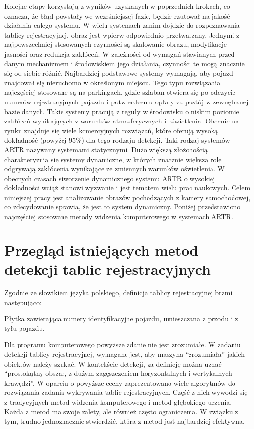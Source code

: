 \FloatBarrier
Kolejne etapy korzystają z wyników uzyskanych w poprzednich krokach, co oznacza, że błąd powstały we wcześniejszej fazie, będzie rzutował na jakość działania całego systemu.
W wielu systemach zanim dojdzie do rozpoznawania tablicy rejestracyjnej, obraz jest wpierw odpowiednio przetwarzany.
Jednymi z najpowszechniej stosowanych czynności są skalowanie obrazu, modyfikacje jasności oraz redukcja zakłóceń.
W zależności od wymagań stawianych przed danym mechanizmem i środowiskiem jego działania, czynności te mogą znacznie się od siebie różnić.
Najbardziej podstawowe systemy wymagają, aby pojazd znajdował się nieruchomo w określonym miejscu.
Tego typu rozwiązania najczęściej stosowane są na parkingach, gdzie szlaban otwiera się po odczycie numerów rejestracyjnych pojazdu i potwierdzeniu opłaty za postój w zewnętrznej bazie danych.
Takie systemy pracują z reguły w środowisku o niskim poziomie zakłóceń wynikających z warunków atmosferycznych i oświetlenia.
Obecnie na rynku znajduje się wiele komercyjnych rozwiązań, które oferują wysoką dokładność (powyżej 95\%) dla tego rodzaju detekcji.
Taki rodzaj systemów ARTR nazywany systemami statycznymi.
Dużo większą złożonością charakteryzują się systemy dynamiczne, w których znacznie większą rolę odgrywają zakłócenia wynikające ze zmiennych warunków oświetlenia.
W obecnych czasach stworzenie dynamicznego systemu ARTR o wysokiej dokładności wciąż stanowi wyzwanie i jest tematem wielu prac naukowych.
Celem niniejszej pracy jest analizowanie obrazów pochodzących z kamery samochodowej, co zdecydowanie sprawia, że jest to system dynamiczny.
Poniżej przedstawiono najczęściej stosowane metody widzenia komputerowego w systemach ARTR.


\section{Przegląd istniejących metod detekcji tablic rejestracyjnych}

Zgodnie ze słowikiem języka polskiego, definicja tablicy rejestracyjnej brzmi następująco:
\begin{definition}
    Płytka zawierająca numery identyfikacyjne pojazdu, umieszczana z przodu i z tyłu pojazdu.
\end{definition}
Dla programu komputerowego powyższe zdanie nie jest zrozumiałe.
W zadaniu detekcji tablicy rejestracyjnej, wymagane jest, aby maszyna ``zrozumiała'' jakich obiektów należy szukać.
W kontekście detekcji, za definicję można uznać ``prostokątny obszar, z dużym zagęszczeniem horyzontalnych i wertykalnych krawędzi''\cite{824138}.
W oparciu o powyższe cechy zaprezentowano wiele algorytmów do rozwiązania zadania wykrywania tablic rejestracyjnych.
Część z nich wywodzi się z tradycyjnych metod widzenia komputerowego i metod głębokiego uczenia.
Każda z metod ma swoje zalety, ale również często ograniczenia.
W związku z tym, trudno jednoznacznie stwierdzić, która z metod jest najbardziej efektywna.

